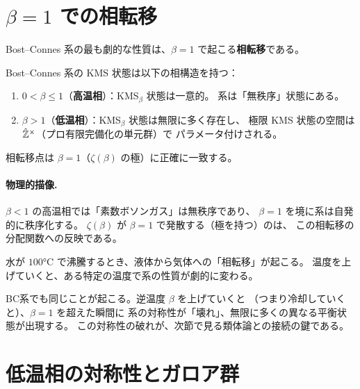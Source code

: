 \section{$\beta = 1$ での相転移}
\label{sec:phase-transition}

Bost--Connes 系の最も劇的な性質は、$\beta = 1$ で起こる\textbf{相転移}である。

\begin{theorem}[BC系の相構造]
\label{thm:BC-phases}
Bost--Connes 系の KMS 状態は以下の相構造を持つ：
\begin{enumerate}
  \item $0 < \beta \le 1$（\textbf{高温相}）：KMS$_\beta$ 状態は一意的。
        系は「無秩序」状態にある。
  \item $\beta > 1$（\textbf{低温相}）：KMS$_\beta$ 状態は無限に多く存在し、
        極限 KMS 状態の空間は $\hat{\mathbb{Z}}^{\times}$（プロ有限完備化の単元群）で
        パラメータ付けされる。
\end{enumerate}
相転移点は $\beta = 1$（$\zeta(\beta)$ の極）に正確に一致する。
\end{theorem}

\paragraph{物理的描像.}
$\beta < 1$ の高温相では「素数ボソンガス」は無秩序であり、
$\beta = 1$ を境に系は自発的に秩序化する。
$\zeta(\beta)$ が $\beta = 1$ で発散する（極を持つ）のは、
この相転移の分配関数への反映である。

\begin{hsbox}
水が $100°$C で沸騰するとき、液体から気体への「相転移」が起こる。
温度を上げていくと、ある特定の温度で系の性質が劇的に変わる。

BC系でも同じことが起こる。逆温度 $\beta$ を上げていくと
（つまり冷却していくと）、$\beta = 1$ を超えた瞬間に
系の対称性が「壊れ」、無限に多くの異なる平衡状態が出現する。
この対称性の破れが、次節で見る類体論との接続の鍵である。
\end{hsbox}


\section{低温相の対称性とガロア群}
\label{sec:galois-symmetry}

